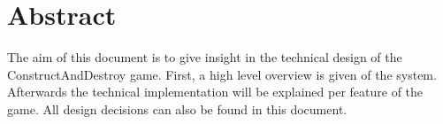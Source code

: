 \section{Abstract}
The aim of this document is to give insight in the technical design of the ConstructAndDestroy game. First, a high level overview is given of the system. Afterwards the technical implementation will be explained per feature of the game. All design decisions can also be found in this document.